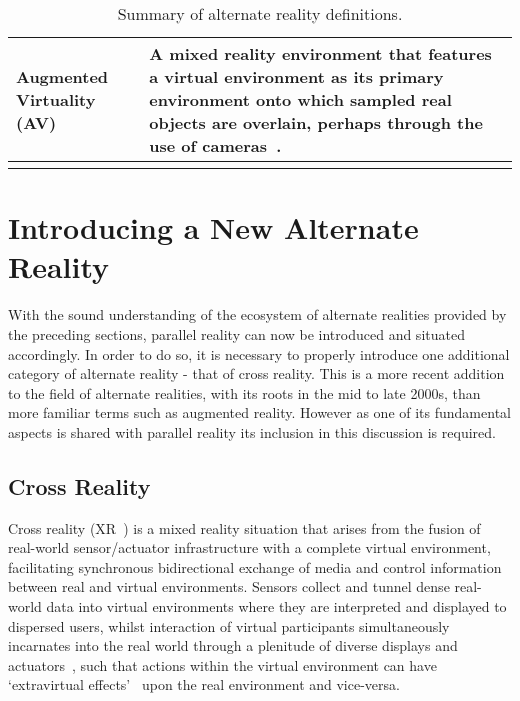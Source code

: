 \begin{center}
\begin{longtable}{ l p{10cm} }
Augmented Virtuality (AV) & A mixed reality environment that features a virtual environment as its primary environment onto which sampled real objects are overlain, perhaps through the use of cameras~\cite{caballero:behand}. \\


\bottomrule
\caption{Summary of alternate reality definitions.}
\label{adopted-alternate-reality-definitions}
\end{longtable}
\end{center}


\section{Introducing a New Alternate Reality}

With the sound understanding of the ecosystem of alternate realities provided by the preceding sections, parallel reality can now be introduced and situated accordingly. In order to do so, it is necessary to properly introduce one additional category of alternate reality - that of cross reality. This is a more recent addition to the field of alternate realities, with its roots in the mid to late 2000s, than more familiar terms such as augmented reality. However as one of its fundamental aspects is shared with parallel reality its inclusion in this discussion is required.


\subsection{Cross Reality}
\label{sec_crossreality}

\newcommand{\SLfootnote}{\footnote{Second Life.}}

Cross reality (XR~\cite{kim:practical}) is a mixed reality situation that arises from the fusion of real-world sensor/actuator infrastructure with a complete virtual environment, facilitating synchronous bidirectional exchange of media and control information between real and virtual environments. Sensors collect and tunnel dense real-world data into virtual environments where they are interpreted and displayed to dispersed users, whilst interaction of virtual participants simultaneously incarnates into the real world through a plenitude of diverse displays and actuators~\cite{Paradiso2009}, such that actions within the virtual environment can have `extravirtual effects'~\cite{Soraker2010} upon the real environment and vice-versa.

